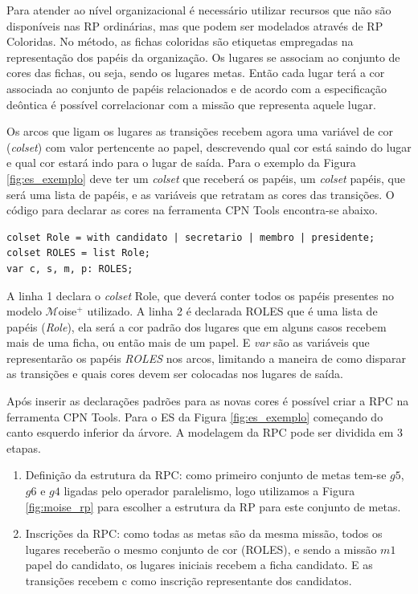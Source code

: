 Para atender ao nível organizacional é necessário utilizar recursos que não são disponíveis nas RP ordinárias, mas que podem ser modelados através de RP Coloridas. No método, as fichas coloridas são etiquetas empregadas na representação  dos papéis da organização. Os lugares se associam ao conjunto de cores das fichas, ou seja, sendo os lugares metas. Então cada lugar terá a cor associada ao conjunto de papéis relacionados e de acordo com a especificação deôntica é possível correlacionar com a missão que representa aquele lugar.

Os arcos que ligam os lugares as transições recebem agora uma variável de cor (\textit{colset}) com valor pertencente ao papel, descrevendo qual cor está saindo do lugar e qual cor estará indo para o lugar de saída. Para o exemplo da Figura \ref{fig:es_exemplo} deve  ter um \textit{colset} que receberá os papéis, um \textit{colset} papéis, que será uma lista de papéis, e as variáveis que retratam as cores das transições. O código para declarar as cores na ferramenta CPN Tools encontra-se abaixo.

\begin{lstlisting}
colset Role = with candidato | secretario | membro | presidente;
colset ROLES = list Role;
var c, s, m, p: ROLES;
\end{lstlisting}

A linha 1 declara o \textit{colset} Role, que deverá conter todos os papéis presentes no modelo $\mathcal{M}$oise$^{+}$ utilizado.  A linha 2 é declarada ROLES que é uma lista de papéis (\textit{Role}), ela será a cor padrão dos lugares que em alguns casos recebem mais de uma ficha, ou então mais de um papel. E \textit{var} são as variáveis que representarão os papéis \textit{ROLES} nos arcos, limitando a maneira de como disparar as transições e quais cores devem ser colocadas nos lugares de saída.

Após inserir as declarações padrões para as novas cores é possível criar a RPC na ferramenta CPN Tools. Para o ES da Figura \ref{fig:es_exemplo} começando do canto esquerdo inferior da árvore. A modelagem da RPC pode ser dividida em 3 etapas.

\begin{enumerate}
\item Definição da estrutura da RPC: como primeiro conjunto de metas tem-se $g5$, $g6$ e $g4$ ligadas pelo operador paralelismo, logo utilizamos a Figura \ref{fig:moise_rp} para escolher a estrutura da RP para este conjunto de metas.
\item Inscrições da RPC:  como todas as metas são da mesma missão, todos os lugares receberão o mesmo conjunto de cor (ROLES), e sendo a missão $m1$  papel do candidato, os lugares iniciais recebem a ficha candidato. E as transições recebem c como inscrição representante dos candidatos.

\end{enumerate}

